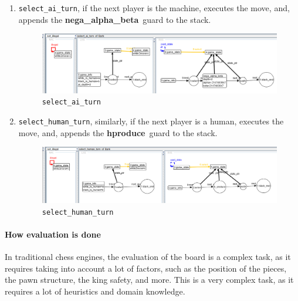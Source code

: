 \documentclass[a4paper, 10pt]{scrartcl}
\newcommand{\noderepr}[1]{\textsf{\textbf{#1}}}
\newcommand{\hproduce}{\noderepr{hproduce}}
\newcommand{\ai}{\noderepr{nega\_alpha\_beta}}
\begin{document}
    \begin{enumerate}
        \item \texttt{select\_ai\_turn}, if the next player is the machine, executes the move, and, appends the \ai\ guard to the stack.
        \begin{figure}[H]
            \centering
            \includegraphics[width=.8\linewidth]{images/select_ai_turn.png}
            \caption{\texttt{select\_ai\_turn}}
        \end{figure}
        \item \texttt{select\_human\_turn}, similarly, if the next player is a human, executes the move, and, appends the \hproduce\ guard to the stack.
        \begin{figure}[H]
            \centering
            \includegraphics[width=.8\linewidth]{images/select_human_turn.png}
            \caption{\texttt{select\_human\_turn}}
        \end{figure}
    \end{enumerate}

    \paragraph*{How evaluation is done} In traditional chess engines, the evaluation of the board is a complex task, as it requires taking into account a lot of factors, such as the position of the pieces, the pawn structure, the king safety, and more. This is a very complex task, as it requires a lot of heuristics and domain knowledge.
    
\end{document}
